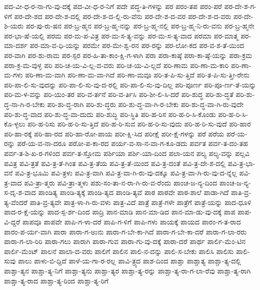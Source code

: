 {ಪದ-ವೀ-ಧ-ರ-ನಾ-ಗು-ವು-ದಕ್ಕೆ
ಪದ-ವೀ-ಧ-ರ-ನಿಗೆ
ಪದೇ
ಪದ್ಧ-ತಿ-ಗಳನ್ನು
ಪರ
ಪರಂ-ತಪ
ಪರಂ-ಪರೆ
ಪರ-ದೇ-ಶ-ಗ-ಳಿಗೆ
ಪರ-ದೇ-ಶದ
ಪರ-ದೇ-ಶ-ದಲ್ಲಿ
ಪರ-ದೇ-ಶ-ದ-ಲ್ಲಿ-ರು-ವೆನು
ಪರ-ದೇ-ಶ-ದ-ವರ
ಪರ-ದೇ-ಶ-ದ-ವರು
ಪರ-ದೇ-ಶಿ-ಯರು
ಪರ-ಪು-ರು-ಷನ
ಪರ-ಬ್ರ-ಹ್ಮನ
ಪರ-ಬ್ರ-ಹ್ಮ-ನನ್ನು
ಪರ-ಬ್ರ-ಹ್ಮ-ನಲ್ಲಿ
ಪರ-ಬ್ರ-ಹ್ಮ-ನಿ-ರು-ವನು
ಪರ-ಬ್ರ-ಹ್ಮನೇ
ಪರ-ಭಾ-ಷೆ-ಯಲ್ಲಿ
ಪರಮ
ಪರ-ಮ-ಪ-ವಿತ್ರ
ಪರ-ಮ-ಸ-ತ್ಯ-ವನ್ನು
ಪರ-ಮ-ಸ-ತ್ಯ-ವಾದ
ಪರಮಾ
ಪರ-ಮಾತ್ಮ
ಪರ-ಮಾ-ದರ್ಶ
ಪರ-ಮಾ-ವ-ಧಿ-ಯನ್ನು
ಪರಮೇ
ಪರ-ಮೇ-ಶ್ವ-ರನ
ಪರ-ರನ್ನು
ಪರ-ಲೋ-ಕದ
ಪರ-ವ-ಶ-ತೆ-ಯಿಂದ
ಪರ-ವಾಗಿ
ಪರ-ಶು-ರಾಮ
ಪರ-ಸ್ಪರ
ಪರ-ಹಿ-ತಾ-ಕಾಂ-ಕ್ಷಿ-ಗ-ಳಾಗಿ
ಪರಾ
ಪರಾ-ಕಾಷ್ಠೆ
ಪರಾ-ಕಾ-ಷ್ಠೆ-ಯನ್ನು
ಪರಾ-ಕ್ರಮ
ಪರಾ-ಕ್ರ-ಮ-ವುಳ್ಳ
ಪರಿ
ಪರಿ-ಚ-ಯ-ವಿ-ಲ್ಲ-ದ-ವರು
ಪರಿ-ಚ-ಯ-ವಿ-ಲ್ಲದೆ
ಪರಿ-ಣಾಮ
ಪರಿ-ಣಾ-ಮ-ಕಾರಿ
ಪರಿ-ಣಾ-ಮ-ಗಳು
ಪರಿ-ಣಾ-ಮ-ವಾಗಿ
ಪರಿ-ಣಾ-ಮ-ವಾ-ಗಿದೆ
ಪರಿ-ಣಾ-ಮವೂ
ಪರಿ-ತ-ಪಿ-ಸು-ತ್ತಿದೆ
ಪರಿ-ತ-ಪಿ-ಸು-ತ್ತೀ-ರೇನು
ಪರಿ-ಪಾ-ಲಿ-ಸು-ವುದನ್ನು
ಪರಿ-ಪಾ-ಲಿ-ಸು-ವು-ದ-ರಲ್ಲಿ
ಪರಿ-ಪಾ-ಲಿ-ಸು-ವು-ದಿಲ್ಲ
ಪರಿ-ಪೂರ್ಣ
ಪರಿ-ಪೂ-ರ್ಣ-ತೆ-ಯನ್ನು
ಪರಿ-ಮ-ಳ-ವನ್ನು
ಪರಿ-ಯಂ-ತರ
ಪರಿ-ವ-ರ್ತನೆ
ಪರಿ-ವ-ರ್ತಿಸಿ
ಪರಿ-ಶೀ-ಲಿ-ಸಿ-ದರೆ
ಪರಿ-ಶುದ್ಧ
ಪರಿ-ಶು-ದ್ಧತೆ
ಪರಿ-ಶು-ದ್ಧ-ನಾ-ಗಿ-ರ-ಬೇಕು
ಪರಿ-ಶು-ದ್ಧ-ರಾಗಿ
ಪರಿ-ಶು-ದ್ಧರು
ಪರಿ-ಶು-ದ್ಧ-ವಾ-ಗಿ-ರ-ಬೇಕು
ಪರಿ-ಶು-ದ್ಧ-ವಾ-ಗಿ-ರು-ವುದೇ
ಪರಿ-ಶು-ದ್ಧ-ವಾದ
ಪರಿ-ಶು-ದ್ಧ-ವಾ-ದುದು
ಪರಿ-ಶುದ್ಧಿ
ಪರಿ-ಸ್ಥಿತಿ
ಪರಿ-ಹ-ರಿಸ
ಪರಿ-ಹ-ರಿ-ಸಿ-ಕೊಂಡು
ಪರಿ-ಹ-ರಿ-ಸಿ-ಕೊ-ಳ್ಳಲು
ಪರಿ-ಹ-ರಿಸು
ಪರಿ-ಹ-ರಿ-ಸು-ತ್ತಿದೆ
ಪರಿ-ಹ-ರಿ-ಸುವ
ಪರಿ-ಹ-ರಿ-ಸು-ವುದು
ಪರಿ-ಹ-ರಿ-ಸು-ವುದೆ
ಪರಿ-ಹಾರ
ಪರಿ-ಹಾ-ರಕ್ಕೆ
ಪರಿ-ಹಾ-ರದ
ಪರಿ-ಹಾ-ರೋ-ಪಾಯ
ಪರೀ-ಕ್ಷಿ-ಸಿದ
ಪರೀಕ್ಷೆ
ಪರೀ-ಕ್ಷೆ-ಗಳನ್ನು
ಪರೆ
ಪರೆಯ
ಪರೆ-ಯ-ರನ್ನು
ಪರೆ-ಯ-ವ-ನಾ-ದರೂ
ಪರೋ-ಪ-ಕಾ-ರದ
ಪರ್ಯ-ವ-ಸಾ-ನ-ವಾ-ಗ-ಕೂ-ಡದು
ಪರ್ವತ
ಪರ್ವ-ತ-ದಂ-ತಹ
ಪರ್ವ-ತ-ಶಿ-ಖ-ರ-ಗಳಿಂದ
ಪರ್ವ-ತ-ಸ್ತೋಮ
ಪರ್ಶಿಯಾ
ಪರ್ಶಿ-ಯಾ-ದಿಂದ
ಪಲಾ-ಯನ
ಪಲ್ಯ
ಪಲ್ಯ-ವನ್ನು
ಪಲ್ಲವಿ
ಪವಿತ್ರ
ಪವಿ-ತ್ರತೆ
ಪವಿ-ತ್ರ-ತೆ-ಗಿಂತ
ಪವಿ-ತ್ರ-ತೆಯ
ಪವಿ-ತ್ರ-ತೆ-ಯಿಂದ
ಪವಿ-ತ್ರ-ದಂತೆ
ಪವಿ-ತ್ರ-ದೇ-ಶ-ದಲ್ಲಿ
ಪವಿ-ತ್ರ-ಭಾ-ವನೆ
ಪವಿ-ತ್ರ-ಭೂಮಿ
ಪವಿ-ತ್ರಳು
ಪವಿ-ತ್ರ-ವಾಗಿ
ಪವಿ-ತ್ರ-ವಾ-ಗಿ-ರು-ವು-ದಕ್ಕೂ
ಪವಿ-ತ್ರ-ವಾ-ಗಿ-ರು-ವು-ದ-ನ್ನೆಲ್ಲ
ಪವಿ-ತ್ರ-ವಾದ
ಪವಿ-ತ್ರಾ-ತ್ಮರು
ಪವಿ-ತ್ರಾ-ತ್ಮಳು
ಪಶು-ಸಂ-ತಾ-ನ-ರಾ-ಗಿ-ರು-ವ-ರೆಂದು
ಪಾಂಚ-ಜ-ನ್ಯ-ದಿಂದ
ಪಾಂಚ-ಜ-ನ್ಯ-ಸ-ದೃ-ಶ-ವಾದ
ಪಾಂಡಿತ್ಯ
ಪಾಂಡಿ-ತ್ಯಕ್ಕೆ
ಪಾಂಡಿ-ತ್ಯದ
ಪಾಂಡಿ-ತ್ಯವೆ
ಪಾಠ
ಪಾಠವೇ
ಪಾಠ-ಶಾಲೆ
ಪಾಡಾ-ಗಿದೆ
ಪಾತಿ-ವ್ರ-ತ್ಯ-ವೆಂದರೆ
ಪಾತಿ-ವ್ರ-ತ್ಯವೇ
ಪಾತ್ರ-ಳಾ-ಗಿ-ರು-ವಳು
ಪಾತ್ರ-ವಿದೆ
ಪಾತ್ರೆ
ಪಾತ್ರೆ-ಗಳೇ
ಪಾತ್ರೆಗೆ
ಪಾತ್ರೆ-ಯನ್ನು
ಪಾದ-ಧೂಳಿ
ಪಾದ-ರ-ಕ್ಷೆ-ಯನ್ನು
ಪಾದ-ಸ್ಪ-ರ್ಶ-ದಿಂದ
ಪಾದ್ರಿ
ಪಾನ-ಮಾಡಿ
ಪಾನ-ಮಾ-ಡಿದ
ಪಾನ-ಮಾ-ಡು-ವು-ದಕ್ಕೆ
ಪಾಪ
ಪಾಪ-ವಿ-ದ್ದರೆ
ಪಾಪವೂ
ಪಾಪವೇ
ಪಾಪಿ-ಗ-ಳಾ-ದರೆ
ಪಾಪಿ-ಗ-ಳಿಗೆ
ಪಾಪಿ-ಗಳು
ಪಾಯಕ್ಕೆ
ಪಾಯದ
ಪಾರಂ-ಗ-ತ-ರಾದ
ಪಾರಂ-ಪ-ರ್ಯ-ವಾಗಿ
ಪಾರಾ
ಪಾರಾ-ಗ-ಅುನು
ಪಾರಾ-ಗ-ಬೇ-ಕಾ-ಗಿದೆ
ಪಾರಾ-ಗ-ಬೇ-ಕಾ-ದರೆ
ಪಾರಾ-ಗ-ಲಾ-ರರು
ಪಾರಾ-ಗ-ಲಾ-ರಿರಿ
ಪಾರಾ-ಗಲು
ಪಾರಾಗಿ
ಪಾರಾ-ಗುವ
ಪಾರಾ-ಗು-ವು-ದಕ್ಕೆ
ಪಾರಾ-ದರೆ
ಪಾರ್ಥ
ಪಾರ್ಲಿ-ಮೆಂ-ಟಿನ
ಪಾರ್ಲಿ-ಮೆಂಟ್
ಪಾಲನೆ
ಪಾಲಾ-ದ-ವರು
ಪಾಲಿಗೆ
ಪಾಲಿನ
ಪಾಲಿ-ನ-ದನ್ನು
ಪಾಲಿ-ಸ-ಬೇಕು
ಪಾಲಿಸಿ
ಪಾಲಿಸು
ಪಾಲಿ-ಸುವು
ಪಾಲು
ಪಾಳು-ಬಿ-ದ್ದಿದೆ
ಪಾಳೆ-ಯ-ಗಾ-ರ-ರಲ್ಲ
ಪಾವಿ-ತ್ರ್ಯದ
ಪಾಶ-ದಿಂದ
ಪಾಶ್ಚಾ
ಪಾಶ್ಚಾತ್ಯ
ಪಾಶ್ಚಾ-ತ್ಯ-ದಲ್ಲಿ
ಪಾಶ್ಚಾ-ತ್ಯನ
ಪಾಶ್ಚಾ-ತ್ಯ-ನಿಗೆ
ಪಾಶ್ಚಾ-ತ್ಯನು
ಪಾಶ್ಚಾ-ತ್ಯರ
ಪಾಶ್ಚಾ-ತ್ಯ-ರನ್ನು
ಪಾಶ್ಚಾ-ತ್ಯ-ರಾ-ಗ-ಲಾ-ರೆವು
ಪಾಶ್ಚಾ-ತ್ಯ-ರಾಗಿ
ಪಾಶ್ಚಾ-ತ್ಯ-ರಾದ
ಪಾಶ್ಚಾ-ತ್ಯ-ರಿಂದ
ಪಾಶ್ಚಾ-ತ್ಯ-ರಿಗೆ
}
